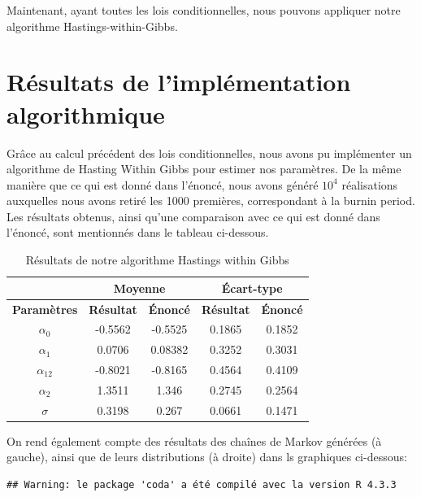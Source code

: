 \documentclass[
]{article}
\begin{document}
Maintenant, ayant toutes les lois conditionnelles, nous pouvons
appliquer notre algorithme Hastings-within-Gibbs.

\hypertarget{ruxe9sultats-de-limpluxe9mentation-algorithmique}{%
\section{Résultats de l'implémentation
algorithmique}\label{ruxe9sultats-de-limpluxe9mentation-algorithmique}}

Grâce au calcul précédent des lois conditionnelles, nous avons pu
implémenter un algorithme de Hasting Within Gibbs pour estimer nos
paramètres. De la même manière que ce qui est donné dans l'énoncé, nous
avons généré \(10^4\) réalisations auxquelles nous avons retiré les 1000
premières, correspondant à la burnin period. Les résultats obtenus,
ainsi qu'une comparaison avec ce qui est donné dans l'énoncé, sont
mentionnés dans le tableau ci-dessous.

\begin{table}[h]
\centering
\small
\begin{minipage}{0.45\textwidth}
\centering
\begin{tabular}{|c|c|c|c|c|}
\hline
\multicolumn{1}{|c|}{} &
\multicolumn{2}{|c|}{\textbf{Moyenne}} & \multicolumn{2}{|c|}{\textbf{Écart-type}} \\
\hline
\textbf{Paramètres} & \textbf{Résultat} & \textbf{Énoncé} & \textbf{Résultat} & \textbf{Énoncé} \\
\hline
$\alpha_0$ & -0.5562 & -0.5525 & 0.1865 & 0.1852 \\
$\alpha_1$ & 0.0706 & 0.08382 & 0.3252 & 0.3031 \\
$\alpha_{12}$ & -0.8021 & -0.8165 & 0.4564 & 0.4109 \\
$\alpha_2$ & 1.3511 & 1.346 & 0.2745 & 0.2564 \\
$\sigma$ & 0.3198 & 0.267 & 0.0661 & 0.1471 \\
\hline
\end{tabular}
\caption{Résultats de notre algorithme Hastings within Gibbs}
\end{minipage}
\end{table}

On rend également compte des résultats des chaînes de Markov générées (à
gauche), ainsi que de leurs distributions (à droite) dans ls graphiques
ci-dessous:

\begin{verbatim}
## Warning: le package 'coda' a été compilé avec la version R 4.3.3
\end{verbatim}
\end{document}

